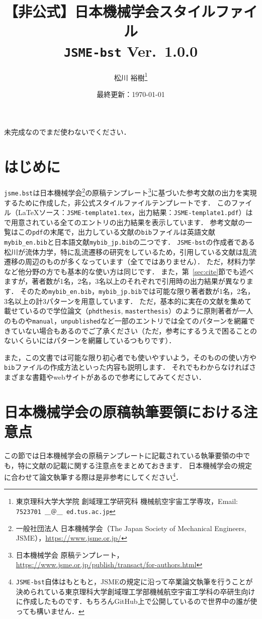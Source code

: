 \documentclass[a4paper,fleqn,12pt,uplatex]{jsarticle}
\title{【非公式】日本機械学会\BibTeX{}スタイルファイル \\ \texttt{JSME-bst} Ver.~1.0.0}
\author{松川 裕樹\thanks{東京理科大学大学院 創域理工学研究科 機械航空宇宙工学専攻，Email: \texttt{7523701 ＿＠＿ ed.tus.ac.jp}}}
\date{最終更新：\today}
\begin{document}
\maketitle
\thispagestyle{cover}

{\huge 未完成なのでまだ使わないでください．}

\section{はじめに}
\label{sec:introduction}
\verb|jsme.bst|は日本機械学会\footnote{一般社団法人 日本機械学会（The Japan Society of Mechanical Engineers, JSME），\url{https://www.jsme.or.jp/}}の原稿テンプレート\footnote{日本機械学会 原稿テンプレート，\url{https://www.jsme.or.jp/publish/transact/for-authors.html}}に基づいた参考文献の出力を実現するために作成した，非公式\BibTeX{}スタイルファイルテンプレートです．
このファイル（\LaTeX{}ソース：\verb|JSME-template1.tex|，出力結果：\verb|JSME-template1.pdf|）は\BibTeX{}で用意されている全てのエントリの出力結果を表示しています．
参考文献の一覧はこの\verb|pdf|の末尾で，出力している文献の\verb|bib|ファイルは英語文献\verb|mybib_en.bib|と日本語文献\verb|mybib_jp.bib|の二つです．
\verb|JSME-bst|の作成者である松川が流体力学，特に乱流遷移の研究をしているため，引用している文献は乱流遷移の周辺のものが多くなっています（全てではありません）．
ただ，材料力学など他分野の方でも基本的な使い方は同じです．
また，第~\ref{sec:cite}節でも述べますが，著者数が1名，2名，3名以上のそれぞれで引用時の出力結果が異なります．
そのため\verb|mybib_en.bib|，\verb|mybib_jp.bib|では可能な限り著者数が1名，2名，3名以上の計3パターンを用意しています．
ただ，基本的に実在の文献を集めて載せているので学位論文（\verb|phdthesis|, \verb|masterthesis|）のように原則著者が一人のものや\verb|manual|，\verb|unpublished|など一部のエントリでは全てのパターンを網羅できていない場合もあるのでご了承ください（ただ，参考にするうえで困ることのないくらいにはパターンを網羅しているつもりです）．

また，この文書では可能な限り\BibTeX{}初心者でも使いやすいよう，\BibTeX{}そのものの使い方や\verb|bib|ファイルの作成方法といった内容も説明します．
それでもわからなければさまざまな書籍やwebサイトがあるので参考にしてみてください．


\section{日本機械学会の原稿執筆要領における注意点}
\label{sec:caution}
この節では日本機械学会の原稿テンプレートに記載されている執筆要領の中でも，特に文献の記載に関する注意点をまとめておきます．
日本機械学会の規定に合わせて論文執筆する際は是非参考にしてください\footnote{\texttt{JSME-bst}自体はもともと，JSMEの規定に沿って卒業論文執筆を行うことが決められている東京理科大学創域理工学部機械航空宇宙工学科の卒研生向けに作成したものです．もちろんGitHub上で公開しているので世界中の誰が使っても構いません．}．
\end{document}
